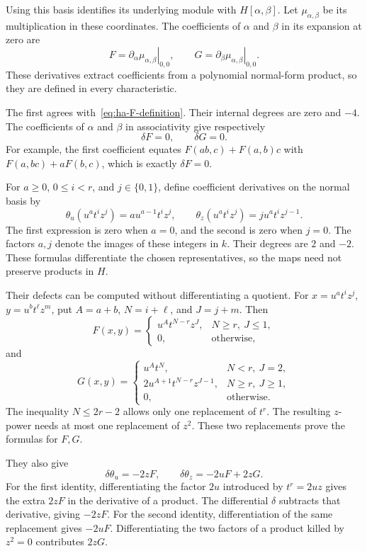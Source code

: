 Using this basis identifies its underlying module with $H[\alpha,\beta]$.
Let $\mu_{\alpha,\beta}$ be its multiplication in these coordinates.
The coefficients of $\alpha$ and $\beta$ in its expansion at zero are
\[
 F=\left.\partial_\alpha\mu_{\alpha,\beta}\right|_{0,0},
 \qquad G=\left.\partial_\beta\mu_{\alpha,\beta}\right|_{0,0}.
\]
These derivatives extract coefficients from a polynomial normal-form
product, so they are defined in every characteristic.

The first agrees with~\eqref{eq:ha-F-definition}. Their internal
degrees are zero and $-4$. The coefficients of $\alpha$ and $\beta$
in associativity give respectively
\begin{equation}\label{eq:ha-FG-cocycles}
 \delta F=0,\qquad\delta G=0.
\end{equation}
For example, the first coefficient equates
$F(ab,c)+F(a,b)c$ with $F(a,bc)+aF(b,c)$,
which is exactly $\delta F=0$.

For $a\geq0$, $0\leq i<r$, and $j\in\{0,1\}$, define
coefficient derivatives on the normal basis by
\[
 \theta_u(u^at^iz^j)=a u^{a-1}t^iz^j,
 \qquad
 \theta_z(u^at^iz^j)=j u^at^iz^{j-1}.
\]
The first expression is zero when $a=0$, and the second is zero
when $j=0$.
The factors $a,j$ denote the images of these integers in $k$.
Their degrees are $2$ and $-2$. These formulas differentiate the chosen
representatives, so the maps need not preserve products in $H$.

Their defects can be computed without differentiating a quotient.
For $x=u^at^iz^j$, $y=u^bt^\ell z^m$, put
$A=a+b$, $N=i+\ell$, and $J=j+m$. Then
\[
 F(x,y)=
 \begin{cases}
 u^At^{N-r}z^J,&N\geq r,\ J\leq1,\\
 0,&\text{otherwise},
 \end{cases}
\]
and
\[
 G(x,y)=
 \begin{cases}
 u^At^N,&N<r,\ J=2,\\
 2u^{A+1}t^{N-r}z^{J-1},&N\geq r,\ J\geq1,\\
 0,&\text{otherwise}.
 \end{cases}
\]
The inequality $N\leq2r-2$ allows only one replacement of $t^r$.
The resulting $z$-power needs at most one replacement of $z^2$.
These two replacements prove the formulas for $F,G$.

They also give
\begin{equation}\label{eq:ha-derivative-defects}
 \delta\theta_u=-2zF,
 \qquad\delta\theta_z=-2uF+2zG.
\end{equation}
For the first identity, differentiating the factor $2u$ introduced
by $t^r=2uz$ gives the extra $2zF$ in the derivative of a product.
The differential $\delta$ subtracts that derivative, giving $-2zF$.
For the second identity, differentiation of the same replacement
gives $-2uF$. Differentiating the two factors of a product killed
by $z^2=0$ contributes $2zG$.

